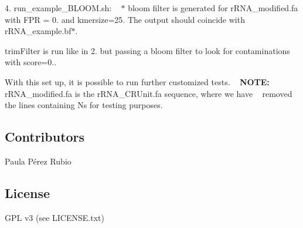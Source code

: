 \begin{DoxyEnumerate}
4. {\ttfamily run\+\_\+example\+\_\+\+B\+L\+O\+O\+M.\+sh}\+: ~\newline
 $\ast$ bloom filter is generated for {\ttfamily r\+R\+N\+A\+\_\+modified.\+fa} with F\+PR = 0. and {\ttfamily kmersize=25}. The output should coincide with {\ttfamily r\+R\+N\+A\+\_\+example.\+bf$\ast$}.
\begin{DoxyItemize}
\item trim\+Filter is run like in 2. but passing a bloom filter to look for contaminations with {\ttfamily score=0.}.
\end{DoxyItemize}
\item With this set up, it is possible to run further customized tests. ~\newline
 {\bfseries N\+O\+TE\+:} {\ttfamily r\+R\+N\+A\+\_\+modified.\+fa} is the {\ttfamily r\+R\+N\+A\+\_\+\+C\+R\+Unit.\+fa} sequence, where we have ~\newline
 removed the lines containing N\textquotesingle{}s for testing purposes. ~\newline

\end{DoxyEnumerate}

\subsection*{Contributors}

Paula Pérez Rubio

\subsection*{License}

G\+PL v3 (see L\+I\+C\+E\+N\+S\+E.\+txt) 